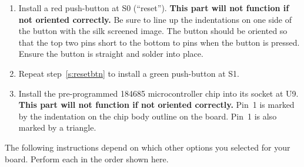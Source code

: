 \documentclass[letterpaper,twoside,onecolumn,openright,final]{memoir}
\begin{document}
\begin{enumerate}
\item\label{s:resetbtn}
	Install a red push-button at S0 (``reset'').  {\bfseries This part will not function if
	not oriented correctly.} Be sure to line up  the indentations on one side of the button
	with the silk screened image.  The button should be oriented so that the top two pins
	short to the bottom to pins when the button is pressed.  Ensure the button is straight
	and solder into place.
\item
	Repeat step~\ref{s:resetbtn} to install a green push-button at S1.
\item
	Install the pre-programmed 184685 microcontroller chip into its socket at U9.
	{\bfseries This part will not function if not oriented correctly.}  Pin~1 is marked by
	the indentation on the chip body outline on the board.  Pin~1 is also marked by a triangle.
\end{enumerate}

The following instructions depend on which other options you selected for your board.
Perform each in the order shown here.
\end{document}
